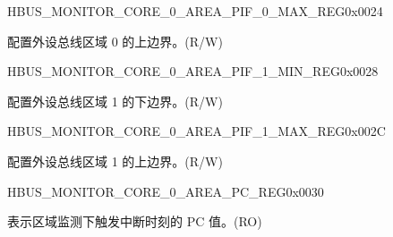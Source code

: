 \begin{register}{H}{BUS\_MONITOR\_CORE\_0\_AREA\_PIF\_0\_MAX\_REG}{0x0024}\label{regdesc:BUSMONITORCORE0AREAPIF0MAXREG}
%
\regnewline%
\begin{regdesc}\begin{reglist}
\label{fielddesc:BUSMONITORCORE0AREAPIF0MAX}\item [BUS\_MONITOR\_CORE\_0\_AREA\_PIF\_0\_MAX] 配置外设总线区域 0 的上边界。(R/W)
\end{reglist}\end{regdesc}
\end{register}


\begin{register}{H}{BUS\_MONITOR\_CORE\_0\_AREA\_PIF\_1\_MIN\_REG}{0x0028}\label{regdesc:BUSMONITORCORE0AREAPIF1MINREG}
%
\regnewline%
\begin{regdesc}\begin{reglist}
\label{fielddesc:BUSMONITORCORE0AREAPIF1MIN}\item [BUS\_MONITOR\_CORE\_0\_AREA\_PIF\_1\_MIN] 配置外设总线区域 1 的下边界。(R/W)
\end{reglist}\end{regdesc}
\end{register}


\begin{register}{H}{BUS\_MONITOR\_CORE\_0\_AREA\_PIF\_1\_MAX\_REG}{0x002C}\label{regdesc:BUSMONITORCORE0AREAPIF1MAXREG}
%
\regnewline%
\begin{regdesc}\begin{reglist}
\label{fielddesc:BUSMONITORCORE0AREAPIF1MAX}\item [BUS\_MONITOR\_CORE\_0\_AREA\_PIF\_1\_MAX] 配置外设总线区域 1 的上边界。(R/W)
\end{reglist}\end{regdesc}
\end{register}


\begin{register}{H}{BUS\_MONITOR\_CORE\_0\_AREA\_PC\_REG}{0x0030}\label{regdesc:BUSMONITORCORE0AREAPCREG}
%
\regnewline%
\begin{regdesc}\begin{reglist}
\label{fielddesc:BUSMONITORCORE0AREAPC}\item [BUS\_MONITOR\_CORE\_0\_AREA\_PC] 表示区域监测下触发中断时刻的 PC 值。(RO)
\end{reglist}\end{regdesc}
\end{register}



